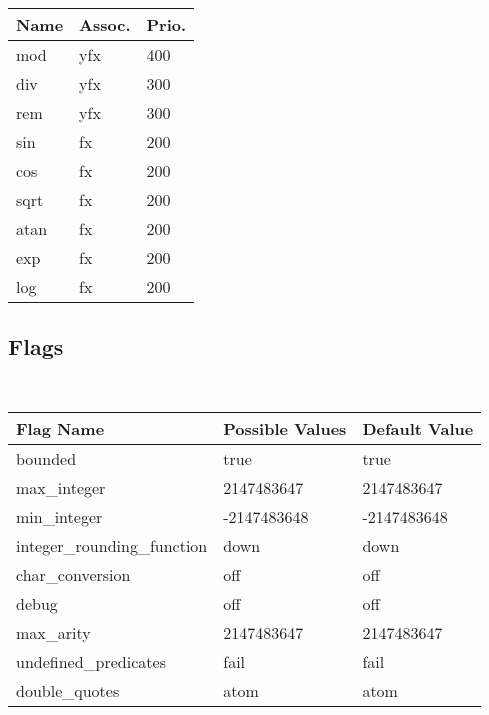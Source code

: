 \begin{table}[h]
    \begin{center}{\small\tt
    \begin{tabular}{p{2cm}|p{1cm}|p{1cm}}\hline\hline
    Name & Assoc. & Prio. \\ \hline
    mod   & yfx & 400\\
    div   & yfx & 300\\
    rem   & yfx & 300\\
    sin   & fx & 200\\
    cos   & fx & 200\\
    sqrt  & fx & 200\\
    atan  & fx & 200\\
    exp   & fx & 200\\
    log   & fx & 200\\
    \hline\hline
    \end{tabular}
    }\end{center}
\end{table}

\subsection{Flags}

\begin{table}[h]
    \begin{center}{\small\tt
    \begin{tabular}{p{6cm}|p{3cm}|p{3cm}}\hline\hline
        Flag Name   & Possible Values & Default Value\\ \hline\hline
        bounded         & {true}           &  true \\
        max\_integer     & {2147483647}     &  2147483647 \\
        min\_integer     & {-2147483648}    &  -2147483648 \\
        integer\_rounding\_function & {down} & down \\
        char\_conversion & {off}           & off \\
        debug           & {off}           & off \\
        max\_arity       & {2147483647}    & 2147483647 \\
        undefined\_predicates & {fail}         & fail \\
        double\_quotes & {atom}         & atom \\
    \hline\hline
    \end{tabular}
    }\end{center}
\end{table}

